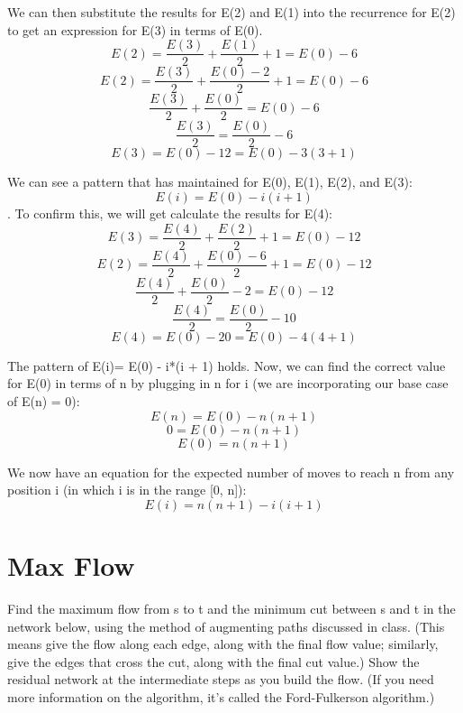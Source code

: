 \documentclass[11pt, solution, letterpaper]{format}
\begin{document}
We can then substitute the results for E(2) and E(1) into the recurrence for E(2) to get an expression for E(3) in terms of E(0). 
$$E(2) = \frac{E(3)}{2} + \frac{E(1)}{2} + 1 = E(0) - 6 $$
$$E(2) = \frac{E(3)}{2} + \frac{E(0) - 2}{2} + 1 = E(0) - 6 $$
$$\frac{E(3)}{2} + \frac{E(0)}{2} = E(0) - 6 $$
$$\frac{E(3)}{2} = \frac{E(0)}{2} - 6 $$
$$E(3) = E(0) - 12 = E(0) - 3(3 + 1)$$

We can see a pattern that has maintained for E(0), E(1), E(2), and E(3): $$E(i) = E(0) - i(i + 1)$$. To confirm this, we will get calculate the results for E(4): 
$$E(3) = \frac{E(4)}{2} + \frac{E(2)}{2} + 1 = E(0) - 12 $$
$$E(2) = \frac{E(4)}{2} + \frac{E(0) - 6}{2} + 1 = E(0) - 12 $$
$$\frac{E(4)}{2} + \frac{E(0)}{2} - 2 = E(0) - 12 $$
$$\frac{E(4)}{2} = \frac{E(0)}{2} - 10 $$
$$E(4) = E(0) - 20 = E(0) - 4(4 + 1)$$

The pattern of E(i)= E(0) - i*(i + 1) holds. Now, we can find the correct value for E(0) in terms of n by plugging in n for i (we are incorporating our base case of E(n) = 0):
$$ E(n) = E(0) - n(n + 1)$$
$$ 0 = E(0) - n(n + 1)$$
$$ E(0) = n(n + 1)$$

We now have an equation for the expected number of moves to reach n from any position i (in which i is in the range [0, n]):
$$E(i) = n(n + 1) - i(i + 1)$$

\clearpage
\section{Max Flow}
Find the maximum flow from s to t and the minimum cut between s and t in the network below, using the
method of augmenting paths discussed in class. (This means give the flow along each edge, along with the
final flow value; similarly, give the edges that cross the cut, along with the final cut value.) Show the residual
network at the intermediate steps as you build the flow. (If you need more information on the algorithm, it’s
called the Ford-Fulkerson algorithm.)\\
\end{document}
